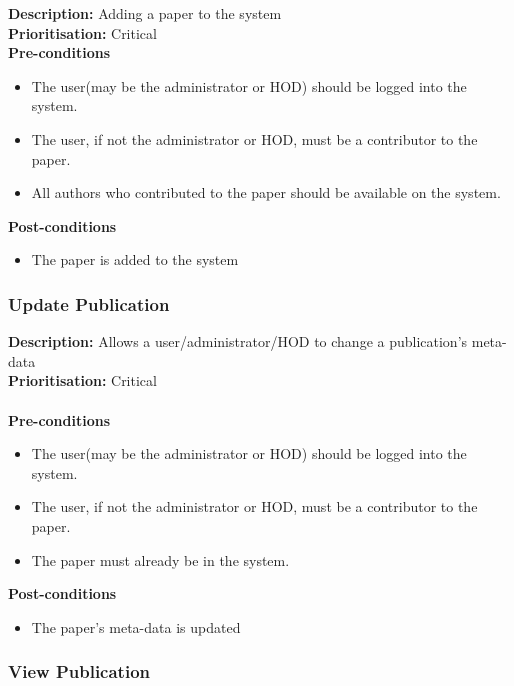 \documentclass[a4paper]{article}
\begin{document}
    \textbf{Description:} Adding a paper to the system\\
    \textbf{Prioritisation:} Critical\\
    
    
    \textbf{Pre-conditions}
     \begin{itemize}
        \item The user(may be the administrator or HOD) should be logged into the system.
        \item The user, if not the administrator or HOD, must be a contributor to the paper.
        \item All authors who contributed to the paper should be available on the system.
   \end{itemize}
    
    \textbf{Post-conditions}
    \begin{itemize}
        \item The paper is added to the system
    \end{itemize}

    \subsubsection{Update Publication}
    
    \textbf{Description:} Allows a user/administrator/HOD to change a publication's meta-data\\
    \textbf{Prioritisation:} Critical\\
    \\
    
    \textbf{Pre-conditions}
     \begin{itemize}
        \item The user(may be the administrator or HOD) should be logged into the system.
        \item The user, if not the administrator or HOD, must be a contributor to the paper.
        \item The paper must already be in the system.
   \end{itemize}
    
    \textbf{Post-conditions}
    \begin{itemize}
        \item The paper's meta-data is updated
    \end{itemize}
    
    \subsubsection{View Publication}
    
\end{document}
